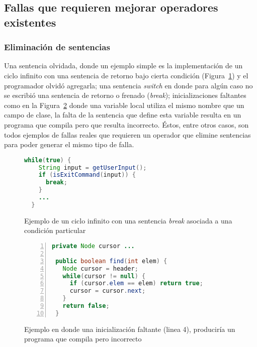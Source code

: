 \subsection{Fallas que requieren mejorar operadores existentes}

\subsubsection{Eliminaci\'on de sentencias}

Una sentencia olvidada, donde un ejemplo simple es la implementaci\'on de un ciclo infinito con una sentencia de retorno bajo cierta condici\'on (Figura~\ref{figures.examples.infCicle}) y el programador olvid\'o agregarla; una sentencia \emph{switch} en donde para alg\'un caso no se escribi\'o una sentencia de retorno o frenado (\emph{break}); inicializaciones faltantes como en la Figura~\ref{figures.examples.localVariableHidingField} donde una variable local utiliza el mismo nombre que un campo de clase, la falta de la sentencia que define esta variable resulta en un programa que compila pero que resulta incorrecto. \'Estos, entre otros casos, son todos ejemplos de fallas reales que requieren un operador que elimine sentencias para poder generar el mismo tipo de falla.

\begin{figure}
	\centering
	\begin{lstlisting}[frame=single, mathescape=true,xleftmargin=0.012\textwidth,xrightmargin=0.012\textwidth,language=Java,basicstyle={}]
  while(true) {
    String input = getUserInput();
    if (isExitCommand(input)) {
      break;
    }
    ...
  }
	\end{lstlisting}
	\caption{Ejemplo de un ciclo infinito con una sentencia \emph{break} asociada a una condici\'on particular}
	\label{figures.examples.infCicle}
\end{figure}

\begin{figure}
	\begin{lstlisting}[frame=single, numbers=left,framexleftmargin=0.073\textwidth, mathescape=true,xleftmargin=0.085\textwidth,xrightmargin=0.012\textwidth,language=Java,basicstyle={}]
 private Node cursor ...
	
 public boolean find(int elem) {
   Node cursor = header;
   while(cursor != null) {
     if (cursor.elem == elem) return true;
     cursor = cursor.next;
   }
   return false;
 }
	\end{lstlisting}
	\caption{Ejemplo en donde una inicializaci\'on faltante (linea 4), producir\'ia un programa que compila pero incorrecto}
	\label{figures.examples.localVariableHidingField}
\end{figure}

